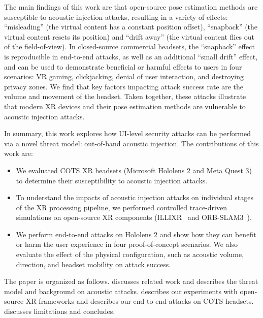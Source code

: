 
The main findings of this work are that open-source pose estimation methods are susceptible to acoustic injection attacks, resulting in a variety of effects: ``misleading'' (the virtual content has a constant position offset), ``snapback'' (the virtual content resets its position) and ``drift away'' (the virtual content flies out of the field-of-view).
In closed-source commercial headsets, the ``snapback'' effect is reproducible in end-to-end attacks, as well as an additional ``small drift'' effect, and can be used to demonstrate beneficial or harmful effects to users in four scenarios: VR gaming, clickjacking, denial of user interaction, and destroying privacy zones.
We find that key factors impacting attack success rate are the volume and movement of the headset.
Taken together, these attacks illustrate that modern XR devices and their pose estimation methods are vulnerable to acoustic injection attacks.


In summary, this work explores how UI-level security attacks can be performed via a novel threat model: out-of-band acoustic injection.
The contributions of this work are:
\begin{itemize}
\item We evaluated COTS XR headsets (Microsoft Hololens 2 and Meta Quest 3) to determine their susceptibility to acoustic injection attacks.
\item To understand the impacts of acoustic injection attacks on individual stages of the XR processing pipeline, we performed controlled trace-driven simulations on open-source XR components (ILLIXR~\cite{huzaifa2022illixr} and ORB-SLAM3~\cite{campos2021orb}).
\item We perform end-to-end attacks on Hololens 2 and show how they can benefit or harm the user experience in four proof-of-concept scenarios. We also evaluate the effect of the physical configuration, such as acoustic volume, direction, and headset mobility on attack success.
\end{itemize}
The paper is organized as follows.  discusses related work and  describes the threat model and background on acoustic attacks.  describes our experiments with open-source XR frameworks and  describes our end-to-end attacks on COTS headsets.  discusses limitations and  concludes.



